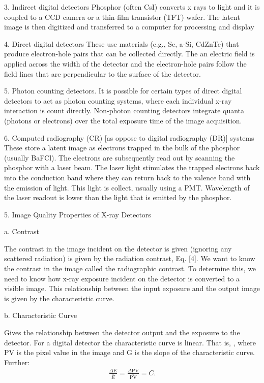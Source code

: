 \documentclass[mphy386-notes.tex]{subfiles}
\begin{document}
3. Indirect digital detectors Phosphor (often CsI) converts x rays to light and
it is coupled to a CCD camera or a thin-film transistor (TFT) wafer. The latent
image is then digitized and transferred to a computer for processing and display

4. Direct digital detectors These use materials (e.g., Se, a-Si, CdZnTe) that
produce electron-hole pairs that can be collected directly. The an electric
field is applied across the width of the detector and the electron-hole pairs
follow the field lines that are perpendicular to the surface of the detector.

5. Photon counting detectors. It is possible for certain types of direct
digital detectors to act as photon counting systems, where each individual x-ray
interaction is count directly. Non-photon counting detectors integrate quanta
(photons or electrons) over the total exposure time of the image acquisition.

6. Computed radiography (CR) [as oppose to digital radiography (DR)] systems
These store a latent image as electrons trapped in the bulk of the phosphor
(usually BaFCl). The electrons are subsequently read out by scanning the
phosphor with a laser beam. The laser light stimulates the trapped electrons
back into the conduction band where they can return back to the valence band
with the emission of light. This light is collect, usually using a PMT.
Wavelength of the laser readout is lower than the light that is emitted by the
phosphor.

5. Image Quality Properties of X-ray Detectors

a. Contrast

The contrast in the image incident on the detector is given (ignoring any
scattered radiation) is given by the radiation contrast, Eq. [4]. We want to
know the contrast in the image called the radiographic contrast. To determine
this, we need to know how x-ray exposure incident on the detector is converted
to a visible image. This relationship between the input exposure and the output
image is given by the characteristic curve.

b. Characteristic Curve

Gives the relationship between the detector output and the exposure to the
detector. For a digital detector the characteristic curve is linear. That is,
, where PV is the pixel value in the image and G is the slope of the
characteristic curve. Further:
\begin{align}
  \frac{\Delta E}{\bar{E}} = \frac{\Delta \text{PV}}{\bar{\text{PV}}} = C.
\end{align}
\end{document}
